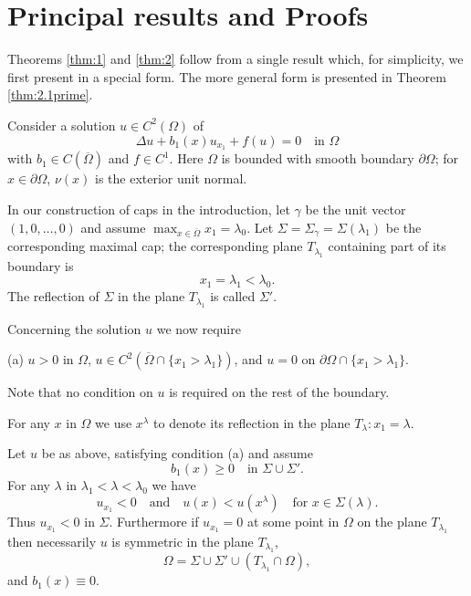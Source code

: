 \section{Principal results and Proofs}\label{sec:2}

\setcounter{theorem}{0}

Theorems \ref{thm:1} and \ref{thm:2} follow from a single result which,
for simplicity, we first present in a special form. The more general form is presented in
Theorem \ref{thm:2.1prime}.

Consider a solution $u\in C^2(\Omega)$ of
\begin{equation}\label{eq:2.1}
  \Delta u + b_1(x)u_{x_1} + f(u) = 0 \quad \text{in } \Omega
\end{equation}
with $b_1\in C(\overline{\Omega})$ and $f\in C^1$.
Here $\Omega$ is bounded with smooth boundary $\partial\Omega$;
for $x\in\partial\Omega$, $\nu(x)$ is the exterior unit normal.

In our construction of caps in the introduction, let $\gamma$ be the unit vector
$(1,0,\ldots,0)$ and assume $\max_{x\in\overline{\Omega}} x_1 = \lambda_0$.
Let $\Sigma = \Sigma_\gamma = \Sigma(\lambda_1)$ be the corresponding maximal cap;
the corresponding plane $T_{\lambda_1}$ containing part of its boundary is
\[x_1 = \lambda_1 < \lambda_0.\]
The reflection of $\Sigma$ in the plane $T_{\lambda_1}$ is called $\Sigma'$.

Concerning the solution $u$ we now require

(a) $u>0$ in $\Omega$, $u\in C^2(\overline{\Omega}\cap\{x_1>\lambda_1\})$,
and $u=0$ on $\partial\Omega\cap\{x_1>\lambda_1\}$.

Note that no condition on $u$ is required on the rest of the boundary.

For any $x$ in $\Omega$ we use $x^\lambda$ to denote its reflection in the plane
$T_\lambda : x_1=\lambda$.

\begin{theorem}\label{thm:2.1}
  Let $u$ be as above, satisfying condition (a) and assume
  \[b_1(x) \geq 0 \quad \text{in } \Sigma\cup\Sigma'.\]
  For any $\lambda$ in $\lambda_1 < \lambda < \lambda_0$ we have
  \begin{equation}\label{eq:2.2}
    u_{x_1} < 0\quad \text{and} \quad u(x) < u(x^\lambda) \quad \text{for } x\in \Sigma(\lambda).
  \end{equation}
  Thus $u_{x_1}<0$ in $\Sigma$. Furthermore if $u_{x_1} = 0$
  at some point in $\Omega$ on the plane $T_{\lambda_1}$
  then necessarily $u$ is symmetric in the plane $T_{\lambda_1}$,
  \begin{equation}\label{eq:2.3}
    \Omega = \Sigma\cup\Sigma'\cup(T_{\lambda_1}\cap\Omega),
  \end{equation}
  and $b_1(x)\equiv 0$.
\end{theorem}

